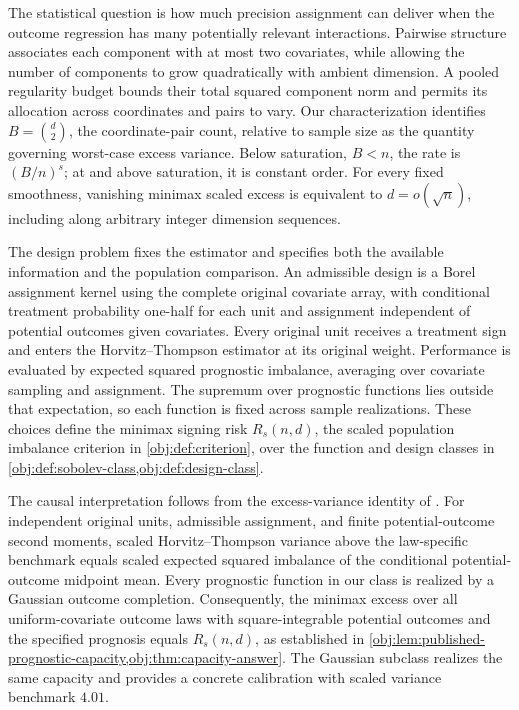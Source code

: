\documentclass[11pt]{article}
\begin{document}
The statistical question is how much precision assignment can deliver when the outcome regression has many potentially relevant interactions. Pairwise structure associates each component with at most two covariates, while allowing the number of components to grow quadratically with ambient dimension. A pooled regularity budget bounds their total squared component norm and permits its allocation across coordinates and pairs to vary. Our characterization identifies \(B=\binom d2\), the coordinate-pair count, relative to sample size as the quantity governing worst-case excess variance. Below saturation, \(B<n\), the rate is \((B/n)^s\); at and above saturation, it is constant order. For every fixed smoothness, vanishing minimax scaled excess is equivalent to \(d=o(\sqrt n)\), including along arbitrary integer dimension sequences.

The design problem fixes the estimator and specifies both the available information and the population comparison. An admissible design is a Borel assignment kernel using the complete original covariate array, with conditional treatment probability one-half for each unit and assignment independent of potential outcomes given covariates. Every original unit receives a treatment sign and enters the Horvitz--Thompson estimator at its original weight. Performance is evaluated by expected squared prognostic imbalance, averaging over covariate sampling and assignment. The supremum over prognostic functions lies outside that expectation, so each function is fixed across sample realizations. These choices define the minimax signing risk \(R_s(n,d)\), the scaled population imbalance criterion in \cref{obj:def:criterion}, over the function and design classes in \cref{obj:def:sobolev-class,obj:def:design-class}.

The causal interpretation follows from the excess-variance identity of \citet[Proposition 2.3, equation (2.4), under Assumption 2.1 and Definition 2.2]{Cytrynbaum2026Limits}. For independent original units, admissible assignment, and finite potential-outcome second moments, scaled Horvitz--Thompson variance above the law-specific benchmark equals scaled expected squared imbalance of the conditional potential-outcome midpoint mean. Every prognostic function in our class is realized by a Gaussian outcome completion. Consequently, the minimax excess over all uniform-covariate outcome laws with square-integrable potential outcomes and the specified prognosis equals \(R_s(n,d)\), as established in \cref{obj:lem:published-prognostic-capacity,obj:thm:capacity-answer}. The Gaussian subclass realizes the same capacity and provides a concrete calibration with scaled variance benchmark \(4.01\).
\end{document}
